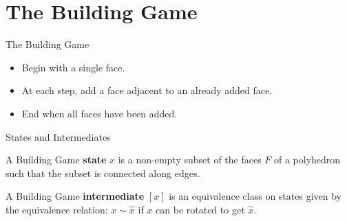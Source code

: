 \documentclass{beamer}
\newcommand{\btVFill}{\vskip0pt plus 1filll}
\begin{document}
\section{The Building Game}
\begin{frame}{The Building Game}
%
  \centering
\begin{itemize}
  \item Begin with a single face.
  \item At each step, add a face adjacent to an already added face.
  \item End when all faces have been added.
\end{itemize}


\end{frame}
\begin{frame}{States and Intermediates}
\begin{definition}
  A Building Game \textbf{state} $x$ is a non-empty subset of the faces $F$ of a polyhedron such that the subset is connected along edges. 
\end{definition} 
\begin{definition}
A Building Game \textbf{intermediate} $[x]$ is an equivalence class on states given by the equivalence relation: $x \sim \hat{x}$ if $x$ can be rotated to get $\hat{x}$.
\end{definition}

\end{frame}
\end{document}
